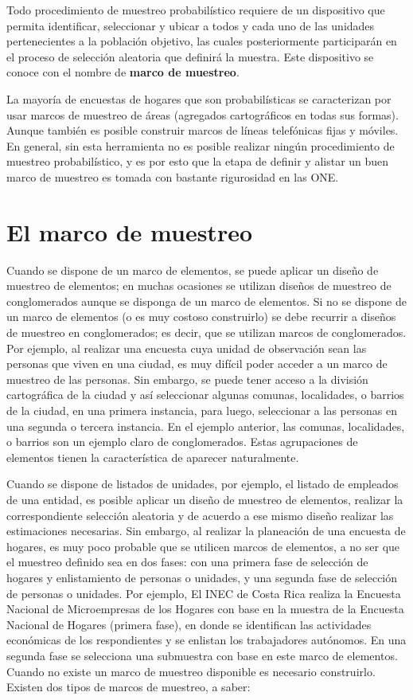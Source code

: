 \documentclass[
  10pt,
  spanish,
]{book}
\begin{document}
Todo procedimiento de muestreo probabilístico requiere de un dispositivo que permita identificar, seleccionar y ubicar a todos y cada uno de las unidades pertenecientes a la población objetivo, las cuales posteriormente participarán en el proceso de selección aleatoria que definirá la muestra. Este dispositivo se conoce con el nombre de \textbf{marco de muestreo}.

La mayoría de encuestas de hogares que son probabilísticas se caracterizan por usar marcos de muestreo de áreas (agregados cartográficos en todas sus formas). Aunque también es posible construir marcos de líneas telefónicas fijas y móviles. En general, sin esta herramienta no es posible realizar ningún procedimiento de muestreo probabilístico, y es por esto que la etapa de definir y alistar un buen marco de muestreo es tomada con bastante rigurosidad en las ONE.

\hypertarget{el-marco-de-muestreo}{%
\section{El marco de muestreo}\label{el-marco-de-muestreo}}

Cuando se dispone de un marco de elementos, se puede aplicar un diseño de muestreo de elementos; en muchas ocasiones se utilizan diseños de muestreo de conglomerados aunque se disponga de un marco de elementos. Si no se dispone de un marco de elementos (o es muy costoso construirlo) se debe recurrir a diseños de muestreo en conglomerados; es decir, que se utilizan marcos de conglomerados. Por ejemplo, al realizar una encuesta cuya unidad de observación sean las personas que viven en una ciudad, es muy difícil poder acceder a un marco de muestreo de las personas. Sin embargo, se puede tener acceso a la división cartográfica de la ciudad y así seleccionar algunas comunas, localidades, o barrios de la ciudad, en una primera instancia, para luego, seleccionar a las personas en una segunda o tercera instancia. En el ejemplo anterior, las comunas, localidades, o barrios son un ejemplo claro de conglomerados. Estas agrupaciones de elementos tienen la característica de aparecer naturalmente.

Cuando se dispone de listados de unidades, por ejemplo, el listado de empleados de una entidad, es posible aplicar un diseño de muestreo de elementos, realizar la correspondiente selección aleatoria y de acuerdo a ese mismo diseño realizar las estimaciones necesarias. Sin embargo, al realizar la planeación de una encuesta de hogares, es muy poco probable que se utilicen marcos de elementos, a no ser que el muestreo definido sea en dos fases: con una primera fase de selección de hogares y enlistamiento de personas o unidades, y una segunda fase de selección de personas o unidades. Por ejemplo, El INEC de Costa Rica realiza la Encuesta Nacional de Microempresas de los Hogares con base en la muestra de la Encuesta Nacional de Hogares (primera fase), en donde se identifican las actividades económicas de los respondientes y se enlistan los trabajadores autónomos. En una segunda fase se selecciona una submuestra con base en este marco de elementos. Cuando no existe un marco de muestreo disponible es necesario construirlo. Existen dos tipos de marcos de muestreo, a saber:
\end{document}
